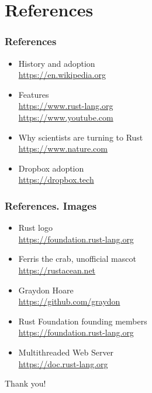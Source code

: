 \documentclass{beamer}
\begin{document}
\section{References}

\begin{frame}
\frametitle{References}
\begin{itemize}
\item History and adoption\\
\href{https://en.wikipedia.org/wiki/Rust_(programming_language)}{https://en.wikipedia.org}
\item Features\\
\href{https://www.rust-lang.org/}{https://www.rust-lang.org}\\
\href{https://www.youtube.com/watch?v=IDpe6k_IIfU}{https://www.youtube.com}
\item Why scientists are turning to Rust\\
\href{https://www.nature.com/articles/d41586-020-03382-2}{https://www.nature.com}
\item Dropbox adoption\\
\href{https://dropbox.tech/infrastructure/rewriting-the-heart-of-our-sync-engine}{https://dropbox.tech}
\end{itemize}
\end{frame}

\begin{frame}
\frametitle{References. Images}
\begin{itemize}
\item Rust logo\\
\href{https://foundation.rust-lang.org/policies/logo-policy-and-media-guide/\#the-rust-trademarks}{https://foundation.rust-lang.org}
\item Ferris the crab, unofficial mascot\\
\href{https://rustacean.net}{https://rustacean.net}
\item Graydon Hoare\\
\href{https://github.com/graydon}{https://github.com/graydon}
\item Rust Foundation founding members\\
\href{https://foundation.rust-lang.org/members/}{https://foundation.rust-lang.org}
\item Multithreaded Web Server\\
\href{https://doc.rust-lang.org/stable/book/ch20-00-final-project-a-web-server.html}{https://doc.rust-lang.org}
\end{itemize}
\end{frame}

\begin{frame}
\Huge{\centerline{Thank you!}}
\end{frame}
\end{document}
